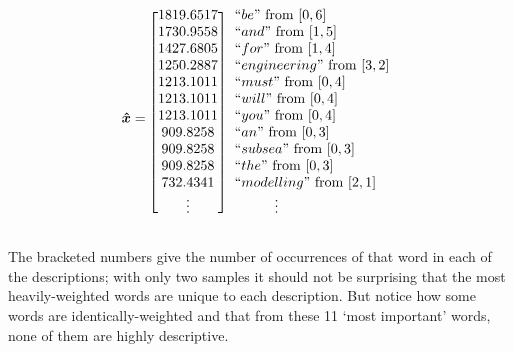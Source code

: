\documentclass[12pt]{article}
\begin{document}
    \begin{equation*}
        \bm{\hat{x}} = 
        \begin{blockarray}{[c] l}
            1819.6517 & ``be"           \text{ from } [0, 6] \\
            1730.9558 & ``and"          \text{ from } [1, 5] \\
            1427.6805 & ``for"          \text{ from } [1, 4] \\
            1250.2887 & ``engineering"  \text{ from } [3, 2] \\
            1213.1011 & ``must"         \text{ from } [0, 4] \\
            1213.1011 & ``will"         \text{ from } [0, 4] \\
            1213.1011 & ``you"          \text{ from } [0, 4] \\
            909.8258 & ``an"            \text{ from } [0, 3] \\
            909.8258 & ``subsea"        \text{ from } [0, 3] \\
            909.8258 & ``the"           \text{ from } [0, 3] \\
            732.4341 & ``modelling"     \text{ from } [2, 1] \\
            \vdots & \hspace{1cm}\vdots
        \end{blockarray}
    \end{equation*}

    The bracketed numbers give the number of occurrences of that word in each of
    the descriptions; with only two samples it should not be surprising that 
    the most heavily-weighted words are unique to each description.  But notice
    how some words are identically-weighted and that from these 11 `most 
    important' words, none of them are highly descriptive.
    
\end{document}
